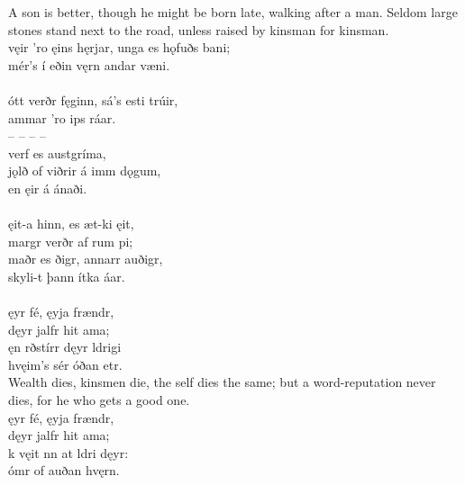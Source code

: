 \bvb A son is better, though he might be born late, walking after a man. Seldom large stones stand next to the road, unless raised by kinsman for kinsman. \\

\bva {}vęir 'ro ęins hęrjar, \hld {}unga es hǫfuðs bani; \\%
\ind mér's í eðin vęrn \hld {}andar væni.\\%

 \\

\bva {}ótt verðr fęginn, \hld sá's esti trúir, \\%
\ind {}ammar 'ro ips ráar. \\%
– – – – \\%
\ind {}verf es austgríma, \\%
jǫlð of viðrir \hld á imm dǫgum, \\%
\ind en ęir á ánaði.\\%

 \\

\bva {}ęit-a hinn, \hld es æt-ki ęit, \\%
\ind margr verðr af rum pi; \\%
maðr es ðigr, \hld annarr auðigr, \\%
\ind skyli-t þann ítka áar.\\%

 \\

\bva {}ęyr fé, \hld {}ęyja frændr, \\%
\ind dęyr jalfr hit ama; \\%
ęn rðstírr \hld dęyr ldrigi \\%
\ind hvęim's sér óðan etr.\\%

\bvb Wealth dies, kinsmen die, the self dies the same; but a word-reputation never dies, for he who gets a good one. \\

\bva {}ęyr fé, \hld {}ęyja frændr, \\%
\ind dęyr jalfr hit ama; \\%
k vęit nn \hld at ldri dęyr: \\%
\ind {}ómr of auðan hvęrn.\\%

